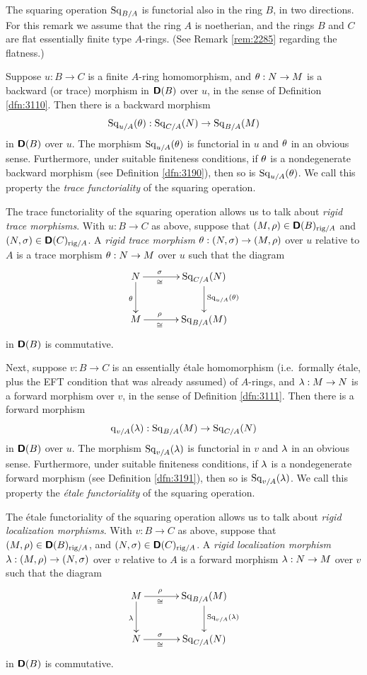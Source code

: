 \begin{rem} \label{rem:4190}
The squaring operation $\operatorname{Sq}_{B / A}$ is functorial also in the ring $B$, 
in two directions. For this remark we assume that the ring $A$ is noetherian, 
and the rings $B$ and $C$ are flat essentially finite type $A$-rings. (See 
Remark \ref{rem:2285} regarding the flatness.)

Suppose $u : B \to C$ is a finite 
$A$-ring homomorphism, and $\theta : N \to M$ is a backward (or trace) morphism 
in $\boldsymbol{\mathsf{D}}(B)$ over $u$, in the sense of Definition \ref{dfn:3110}. 
Then there is a backward morphism
\[ \operatorname{Sq}_{u / A}(\theta) : \operatorname{Sq}_{C / A}(N) \to \operatorname{Sq}_{B / A}(M) \]
in $\boldsymbol{\mathsf{D}}(B)$ over $u$. The morphism $\operatorname{Sq}_{u / A}(\theta)$ is functorial 
in $u$ and $\theta$ in an obvious sense. Furthermore, under suitable finiteness 
conditions, if $\theta$ is a nondegenerate backward morphism (see Definition 
\ref{dfn:3190}), then so is $\operatorname{Sq}_{u / A}(\theta)$. We call this property the 
{\em trace functoriality} of the squaring operation. 

The trace functoriality of the squaring operation allows us to talk about {\em 
rigid trace morphisms}. With $u : B \to C$ as above, suppose that 
$(M, \rho) \in \boldsymbol{\mathsf{D}}(B)_{\mathrm{rig} / A}$ and 
$(N, \sigma) \in \boldsymbol{\mathsf{D}}(C)_{\mathrm{rig} / A}$. A {\em rigid trace morphism} 
$\theta : (N, \sigma) \to (M, \rho)$
over $u$ relative to $A$ is a trace morphism $\theta : N \to M$ over $u$ such 
that the diagram 
\[ \UseTips \xymatrix @C=8ex @R=6ex {
N
\ar[r]^(0.35){\si}_(0.35){\cong}
\ar[d]_{\th}
&
\opn{Sq}_{C / A}(N)
\ar[d]^{\opn{Sq}_{u / A}(\th)}
\\
M
\ar[r]^(0.35){\rho}_(0.35){\cong}
&
\opn{Sq}_{B / A}(M)
} \]
in $\boldsymbol{\mathsf{D}}(B)$ is commutative. 

Next, suppose $v : B \to C$ is an essentially \'etale homomorphism 
(i.e.\ formally \'etale, plus the EFT condition that was already assumed) of 
$A$-rings, and $\lambda : M \to N$ is a forward morphism over $v$, in 
the sense of Definition \ref{dfn:3111}. Then there is a forward morphism 
\[ \operatorname{q}_{v / A}(\lambda) : \operatorname{Sq}_{B / A}(M) \to \operatorname{Sq}_{C / A}(N) \]
in $\boldsymbol{\mathsf{D}}(B)$ over $u$. The morphism $\operatorname{Sq}_{v / A}(\lambda)$ is functorial 
in $v$ and $\lambda$ in an obvious sense. Furthermore, under suitable finiteness 
conditions, if $\lambda$ is a nondegenerate forward morphism (see Definition 
\ref{dfn:3191}), then so is $\operatorname{Sq}_{v / A}(\lambda)$. We call this property the 
{\em \'etale functoriality} of the squaring operation. 

The \'etale functoriality of the squaring operation allows us to talk about 
{\em rigid localization morphisms}. With $v : B \to C$ as above, suppose that 
$(M, \rho) \in \boldsymbol{\mathsf{D}}(B)_{\mathrm{rig} / A}$, and 
$(N, \sigma) \in \boldsymbol{\mathsf{D}}(C)_{\mathrm{rig} / A}$. A {\em rigid localization morphism} 
$\lambda : (M, \rho) \to (N, \sigma)$
over $v$ relative to $A$ is a forward morphism $\lambda : N \to M$ over $v$ such 
that the diagram 
\[ \UseTips \xymatrix @C=8ex @R=6ex {
M
\ar[r]^(0.35){\rho}_(0.35){\cong}
\ar[d]_{\la}
&
\opn{Sq}_{B / A}(M)
\ar[d]^{\opn{Sq}_{v / A}(\la)}
\\
N
\ar[r]^(0.35){\si}_(0.35){\cong}
&
\opn{Sq}_{C / A}(N)
} \]
in $\boldsymbol{\mathsf{D}}(B)$ is commutative. 


\end{rem}
